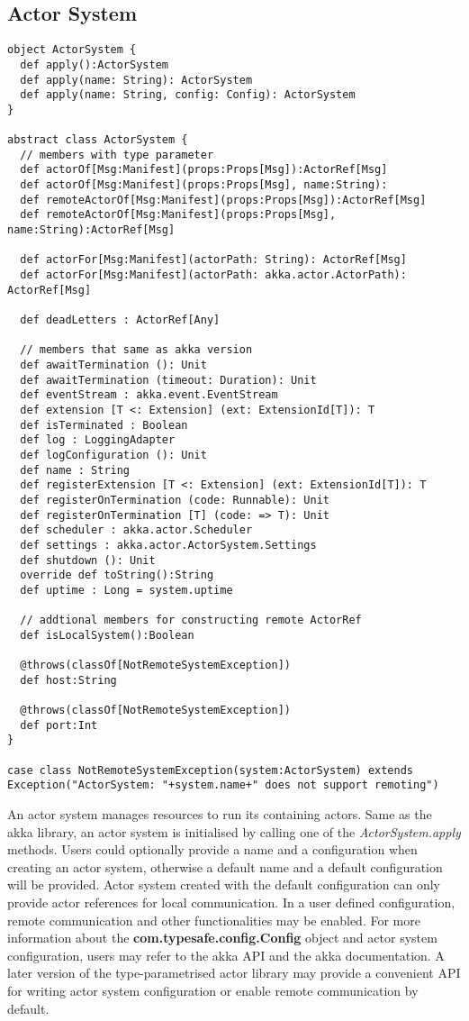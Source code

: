 \subsection{Actor System}
\label{sec_actor_system}
\begin{lstlisting}
object ActorSystem {
  def apply():ActorSystem
  def apply(name: String): ActorSystem
  def apply(name: String, config: Config): ActorSystem
}

abstract class ActorSystem {  
  // members with type parameter
  def actorOf[Msg:Manifest](props:Props[Msg]):ActorRef[Msg]  
  def actorOf[Msg:Manifest](props:Props[Msg], name:String):
  def remoteActorOf[Msg:Manifest](props:Props[Msg]):ActorRef[Msg]  
  def remoteActorOf[Msg:Manifest](props:Props[Msg], name:String):ActorRef[Msg]  

  def actorFor[Msg:Manifest](actorPath: String): ActorRef[Msg]  
  def actorFor[Msg:Manifest](actorPath: akka.actor.ActorPath): ActorRef[Msg]

  def deadLetters : ActorRef[Any]

  // members that same as akka version
  def awaitTermination (): Unit 
  def awaitTermination (timeout: Duration): Unit
  def eventStream : akka.event.EventStream
  def extension [T <: Extension] (ext: ExtensionId[T]): T  
  def isTerminated : Boolean 
  def log : LoggingAdapter  
  def logConfiguration (): Unit
  def name : String
  def registerExtension [T <: Extension] (ext: ExtensionId[T]): T  
  def registerOnTermination (code: Runnable): Unit  
  def registerOnTermination [T] (code: => T): Unit  
  def scheduler : akka.actor.Scheduler  
  def settings : akka.actor.ActorSystem.Settings
  def shutdown (): Unit
  override def toString():String 
  def uptime : Long = system.uptime

  // addtional members for constructing remote ActorRef  
  def isLocalSystem():Boolean
  
  @throws(classOf[NotRemoteSystemException])
  def host:String
  
  @throws(classOf[NotRemoteSystemException])
  def port:Int
}

case class NotRemoteSystemException(system:ActorSystem) extends Exception("ActorSystem: "+system.name+" does not support remoting")
\end{lstlisting}

An actor system manages resources to run its containing actors.  Same as the akka library, an actor system is initialised by calling one of the \textit{ActorSystem.apply} methods.  Users could optionally provide a name and a configuration when creating an actor system, otherwise a default name and a default configuration will be provided.  Actor system created with the default configuration can only provide actor references for local communication.  In a user defined configuration, remote communication and other functionalities may be enabled.  For more information about the \textbf{com.typesafe.config.Config} object and actor system configuration, users may refer to the akka API\cite{akka_api} and the akka documentation\cite{akka_doc}.  A later version of the type-parametrised actor library may provide a convenient API for writing actor system configuration or enable remote communication by default.

